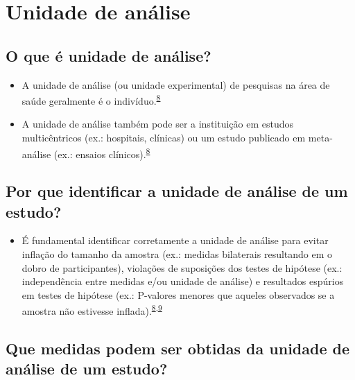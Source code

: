 \documentclass[
  a4paper,
]{book}
\providecommand{\tightlist}{%
  \setlength{\itemsep}{0pt}\setlength{\parskip}{0pt}}
\begin{document}
\hypertarget{unidade-analise}{%
\section{Unidade de análise}\label{unidade-analise}}

\hypertarget{o-que-uxe9-unidade-de-anuxe1lise}{%
\subsection{O que é unidade de análise?}\label{o-que-uxe9-unidade-de-anuxe1lise}}

\begin{itemize}
\item
  A unidade de análise (ou unidade experimental) de pesquisas na área de saúde geralmente é o indivíduo.\textsuperscript{\protect\hyperlink{ref-Altman1997}{8}}
\item
  A unidade de análise também pode ser a instituição em estudos multicêntricos (ex.: hospitais, clínicas) ou um estudo publicado em meta-análise (ex.: ensaios clínicos).\textsuperscript{\protect\hyperlink{ref-Altman1997}{8}}
\end{itemize}

\hypertarget{por-que-identificar-a-unidade-de-anuxe1lise-de-um-estudo}{%
\subsection{Por que identificar a unidade de análise de um estudo?}\label{por-que-identificar-a-unidade-de-anuxe1lise-de-um-estudo}}

\begin{itemize}
\tightlist
\item
  É fundamental identificar corretamente a unidade de análise para evitar inflação do tamanho da amostra (ex.: medidas bilaterais resultando em o dobro de participantes), violações de suposições dos testes de hipótese (ex.: independência entre medidas e/ou unidade de análise) e resultados espúrios em testes de hipótese (ex.: P-valores menores que aqueles observados se a amostra não estivesse inflada).\textsuperscript{\protect\hyperlink{ref-Altman1997}{8},\protect\hyperlink{ref-Matthews1990}{9}}
\end{itemize}

\hypertarget{que-medidas-podem-ser-obtidas-da-unidade-de-anuxe1lise-de-um-estudo}{%
\subsection{Que medidas podem ser obtidas da unidade de análise de um estudo?}\label{que-medidas-podem-ser-obtidas-da-unidade-de-anuxe1lise-de-um-estudo}}
\end{document}
